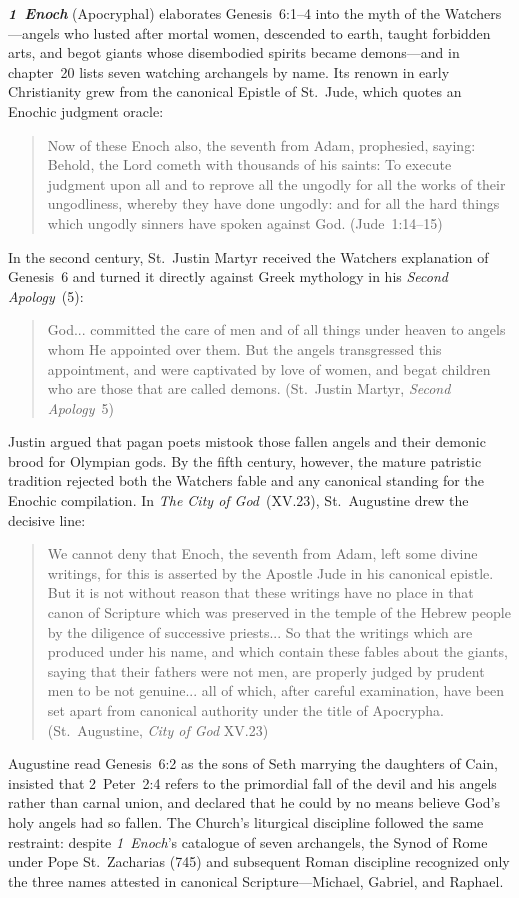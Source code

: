 \textbf{\emph{1~Enoch}} (Apocryphal) elaborates Genesis~6:1--4 into the myth of the Watchers---angels who lusted after mortal women, descended to earth, taught forbidden arts, and begot giants whose disembodied spirits became demons---and in chapter~20 lists seven watching archangels by name. Its renown in early Christianity grew from the canonical Epistle of St.~Jude, which quotes an Enochic judgment oracle:
\begin{quotation}
Now of these Enoch also, the seventh from Adam, prophesied, saying: Behold, the Lord cometh with thousands of his saints: To execute judgment upon all and to reprove all the ungodly for all the works of their ungodliness, whereby they have done ungodly: and for all the hard things which ungodly sinners have spoken against God. (Jude~1:14--15)
\end{quotation}
In the second century, St.~Justin Martyr received the Watchers explanation of Genesis~6 and turned it directly against Greek mythology in his \emph{Second Apology}~(5):
\begin{quotation}
God... committed the care of men and of all things under heaven to angels whom He appointed over them. But the angels transgressed this appointment, and were captivated by love of women, and begat children who are those that are called demons. (St.~Justin Martyr, \emph{Second Apology}~5)
\end{quotation}
Justin argued that pagan poets mistook those fallen angels and their demonic brood for Olympian gods. By the fifth century, however, the mature patristic tradition rejected both the Watchers fable and any canonical standing for the Enochic compilation. In \emph{The City of God}~(XV.23), St.~Augustine drew the decisive line:
\begin{quotation}
We cannot deny that Enoch, the seventh from Adam, left some divine writings, for this is asserted by the Apostle Jude in his canonical epistle. But it is not without reason that these writings have no place in that canon of Scripture which was preserved in the temple of the Hebrew people by the diligence of successive priests... So that the writings which are produced under his name, and which contain these fables about the giants, saying that their fathers were not men, are properly judged by prudent men to be not genuine... all of which, after careful examination, have been set apart from canonical authority under the title of Apocrypha. (St.~Augustine, \emph{City of God} XV.23)
\end{quotation}
Augustine read Genesis~6:2 as the sons of Seth marrying the daughters of Cain, insisted that 2~Peter~2:4 refers to the primordial fall of the devil and his angels rather than carnal union, and declared that he could by no means believe God's holy angels had so fallen. The Church's liturgical discipline followed the same restraint: despite \emph{1~Enoch}'s catalogue of seven archangels, the Synod of Rome under Pope St.~Zacharias (745) and subsequent Roman discipline recognized only the three names attested in canonical Scripture---Michael, Gabriel, and Raphael.

